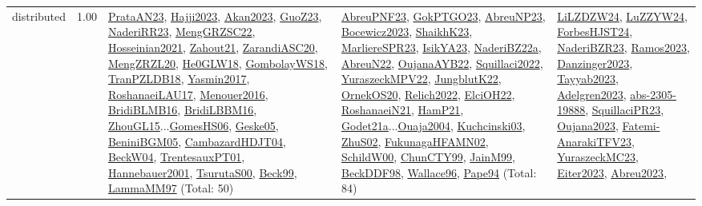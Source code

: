 {\begin{longtable}{p{3cm}r>{\raggedright\arraybackslash}p{6cm}>{\raggedright\arraybackslash}p{6cm}>{\raggedright\arraybackslash}p{8cm}}
\index{distributed}\index{Concepts!distributed}distributed &  1.00 & \hyperref[detail:PrataAN23]{PrataAN23}, \hyperref[detail:Hajji2023]{Hajji2023}, \hyperref[detail:Akan2023]{Akan2023}, \hyperref[detail:GuoZ23]{GuoZ23}, \hyperref[detail:NaderiRR23]{NaderiRR23}, \hyperref[detail:MengGRZSC22]{MengGRZSC22}, \hyperref[detail:Hosseinian2021]{Hosseinian2021}, \hyperref[detail:Zahout21]{Zahout21}, \hyperref[detail:ZarandiASC20]{ZarandiASC20}, \hyperref[detail:MengZRZL20]{MengZRZL20}, \hyperref[detail:He0GLW18]{He0GLW18}, \hyperref[detail:GombolayWS18]{GombolayWS18}, \hyperref[detail:TranPZLDB18]{TranPZLDB18}, \hyperref[detail:Yasmin2017]{Yasmin2017}, \hyperref[detail:RoshanaeiLAU17]{RoshanaeiLAU17}, \hyperref[detail:Menouer2016]{Menouer2016}, \hyperref[detail:BridiBLMB16]{BridiBLMB16}, \hyperref[detail:BridiLBBM16]{BridiLBBM16}, \hyperref[detail:ZhouGL15]{ZhouGL15}...\hyperref[detail:GomesHS06]{GomesHS06}, \hyperref[detail:Geske05]{Geske05}, \hyperref[detail:BeniniBGM05]{BeniniBGM05}, \hyperref[detail:CambazardHDJT04]{CambazardHDJT04}, \hyperref[detail:BeckW04]{BeckW04}, \hyperref[detail:TrentesauxPT01]{TrentesauxPT01}, \hyperref[detail:Hannebauer2001]{Hannebauer2001}, \hyperref[detail:TsurutaS00]{TsurutaS00}, \hyperref[detail:Beck99]{Beck99}, \hyperref[detail:LammaMM97]{LammaMM97} (Total: 50) & \hyperref[detail:AbreuPNF23]{AbreuPNF23}, \hyperref[detail:GokPTGO23]{GokPTGO23}, \hyperref[detail:AbreuNP23]{AbreuNP23}, \hyperref[detail:Bocewicz2023]{Bocewicz2023}, \hyperref[detail:ShaikhK23]{ShaikhK23}, \hyperref[detail:MarliereSPR23]{MarliereSPR23}, \hyperref[detail:IsikYA23]{IsikYA23}, \hyperref[detail:NaderiBZ22a]{NaderiBZ22a}, \hyperref[detail:AbreuN22]{AbreuN22}, \hyperref[detail:OujanaAYB22]{OujanaAYB22}, \hyperref[detail:Squillaci2022]{Squillaci2022}, \hyperref[detail:YuraszeckMPV22]{YuraszeckMPV22}, \hyperref[detail:JungblutK22]{JungblutK22}, \hyperref[detail:OrnekOS20]{OrnekOS20}, \hyperref[detail:Relich2022]{Relich2022}, \hyperref[detail:ElciOH22]{ElciOH22}, \hyperref[detail:RoshanaeiN21]{RoshanaeiN21}, \hyperref[detail:HamP21]{HamP21}, \hyperref[detail:Godet21a]{Godet21a}...\hyperref[detail:Ouaja2004]{Ouaja2004}, \hyperref[detail:Kuchcinski03]{Kuchcinski03}, \hyperref[detail:ZhuS02]{ZhuS02}, \hyperref[detail:FukunagaHFAMN02]{FukunagaHFAMN02}, \hyperref[detail:SchildW00]{SchildW00}, \hyperref[detail:ChunCTY99]{ChunCTY99}, \hyperref[detail:JainM99]{JainM99}, \hyperref[detail:BeckDDF98]{BeckDDF98}, \hyperref[detail:Wallace96]{Wallace96}, \hyperref[detail:Pape94]{Pape94} (Total: 84) & \hyperref[detail:LiLZDZW24]{LiLZDZW24}, \hyperref[detail:LuZZYW24]{LuZZYW24}, \hyperref[detail:ForbesHJST24]{ForbesHJST24}, \hyperref[detail:NaderiBZR23]{NaderiBZR23}, \hyperref[detail:Ramos2023]{Ramos2023}, \hyperref[detail:Danzinger2023]{Danzinger2023}, \hyperref[detail:Tayyab2023]{Tayyab2023}, \hyperref[detail:Adelgren2023]{Adelgren2023}, \hyperref[detail:abs-2305-19888]{abs-2305-19888}, \hyperref[detail:SquillaciPR23]{SquillaciPR23}, \hyperref[detail:Oujana2023]{Oujana2023}, \hyperref[detail:Fatemi-AnarakiTFV23]{Fatemi-AnarakiTFV23}, \hyperref[detail:YuraszeckMC23]{YuraszeckMC23}, \hyperref[detail:Eiter2023]{Eiter2023}, \hyperref[detail:Abreu2023]{Abreu2023}, 
\end{longtable}}
